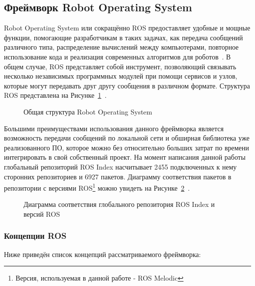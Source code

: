 \subsection{Фреймворк Robot Operating System}
Robot Operating System или сокращённо ROS предоставляет удобные и мощные функции, помогающие разработчикам в таких задачах, как передача сообщений различного типа, распределение вычислений между компьютерами, повторное использование кода и реализация современных алгоритмов для роботов~\cite[с.~7]{ros}. В общем случае, ROS представляет собой инструмент, позволяющий связывать несколько независимых программных модулей при
помощи сервисов и узлов, которые могут передавать друг другу сообщения в различном формате. Структура ROS представлена на Рисунке~\cref{fig:ros-struct}~\cite[с.~19]{ros}.

\begin{figure}[ht]
    \caption{Общая структура Robot Operating System}\label{fig:ros-struct}
\end{figure}

Большими преимуществами использования данного фреймворка является возможность передачи сообщений по локальной сети и обширная библиотека уже реализованного ПО, которое можно без относительно больших затрат по времени интегрировать в свой собственный проект. На момент написания данной работы глобальный репозиторий ROS Index насчитывает 2455 подключенных к нему сторонних репозиториев и 6927 пакетов. Диаграмму соответствия пакетов в репозитории с версиями ROS\footnote{Версия, используемая в данной работе - ROS Melodic} можно увидеть на Рисунке~\cref{fig:ros-repo}~\cite{ros-repo}.

\begin{figure}[ht]
    \caption{Диаграмма соответствия глобального репозитория ROS Index и версий ROS}\label{fig:ros-repo}
\end{figure}

\subsubsection{Концепции ROS}
Ниже приведён список концепций рассматриваемого фреймворка:

